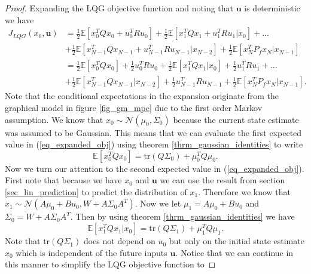 \begin{proof}
Expanding the LQG objective function and noting that $\mathbf{u}$ is deterministic we have  
\begin{equation}
\begin{aligned}
J_{LQG}(x_0, \mathbf{u}) &= \frac{1}{2} \mathbb{E}\left[x_0^TQx_0 + u_0^TRu_0 \right] + \frac{1}{2} \mathbb{E}\left[x_1^TQx_1 + u_1^TRu_1 |x_0\right] + \hdots \\ &+ \frac{1}{2} \mathbb{E}\left[x_{N-1}^TQx_{N-1} + u_{N-1}^TRu_{N-1}|x_{N-2} \right] + \frac{1}{2} \mathbb{E}\left[x_N^TP_fx_N|x_{N-1} \right] \\
&= \frac{1}{2} \mathbb{E}\left[x_0^TQx_0\right] +\frac{1}{2} u_0^TRu_0 + \frac{1}{2} \mathbb{E}\left[x_1^TQx_1|x_0\right] + \frac{1}{2}u_1^TRu_1 + \hdots \\ &+ \frac{1}{2} \mathbb{E}\left[x_{N-1}^TQx_{N-1}|x_{N-2} \right]+ \frac{1}{2}u_{N-1}^TRu_{N-1} + \frac{1}{2} \mathbb{E}\left[x_N^TP_fx_N |x_{N-1}\right].
\end{aligned}
\label{eq_expanded_obj}
\end{equation}
Note that the conditional expectations in the expansion originate from the graphical model in figure \ref{fig_gm_mpc} due to the first order Markov assumption. We know that $x_0\sim \mathcal{N}(\mu_0, \Sigma_0)$ because the current state estimate was assumed to be Gaussian. This means that we can evaluate the first expected value in (\ref{eq_expanded_obj}) using theorem \ref{thrm_gaussian_identities} to write
\begin{equation}
\mathbb{E}\left[x_0^TQx_0\right] = \text{tr}(Q\Sigma_0) + \mu_0^TQ\mu_0.
\label{eq_exp1}
\end{equation} 
Now we turn our attention to the second expected value in (\ref{eq_expanded_obj}). First note that because we have $x_0$ and $\mathbf{u}$ we can use the result from section \ref{sec_lin_prediction} to predict the distribution of $x_1$. Therefore we know that $x_1 \sim \mathcal{N}(A\mu_0+Bu_0, W+A\Sigma_0 A^T)$. Now we let $\mu_1 = A\mu_0+Bu_0$ and $\Sigma_0 = W+A\Sigma_0 A^T$. Then by using theorem \ref{thrm_gaussian_identities} we have 
\begin{equation}
\mathbb{E}\left[x_1^TQx_1|x_0\right] = \text{tr}(Q\Sigma_1) + \mu_1^TQ\mu_1.
\label{eq_exp2}
\end{equation} 
Note that $\text{tr}(Q\Sigma_1)$ does not depend on $u_0$ but only on the initial state estimate $x_0$ which is independent of the future inputs $\mathbf{u}$. Notice that we can continue in this manner to simplify the LQG objective function to

\end{proof}
